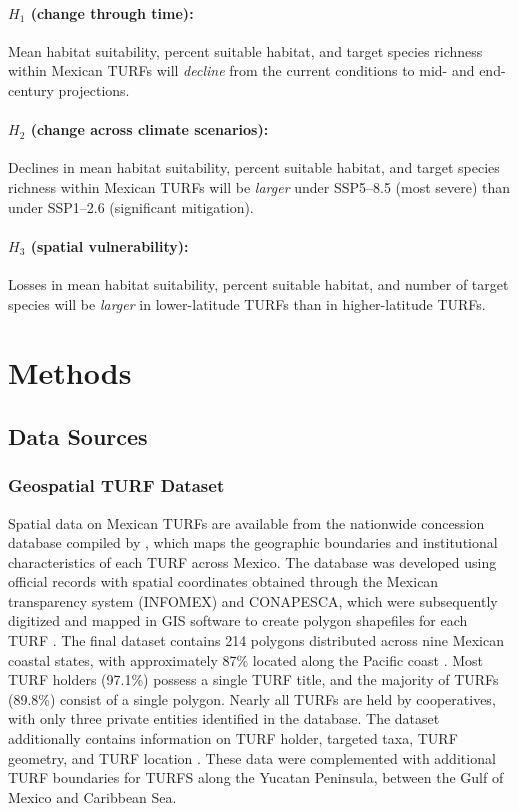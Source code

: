 \documentclass[12pt]{article}
\begin{document}
\paragraph{$H_1$ (change through time):} Mean habitat suitability, percent suitable habitat, and target species richness within Mexican TURFs will \textit{decline} from the current conditions to mid- and end-century projections.

\paragraph{$H_2$ (change across climate scenarios):} Declines in mean habitat suitability, percent suitable habitat, and target species richness within Mexican TURFs will be \textit{larger} under SSP5–8.5 (most severe) than under SSP1–2.6 (significant mitigation).

\paragraph{$H_3$ (spatial vulnerability):}
Losses in mean habitat suitability, percent suitable habitat, and number of target species will be \textit{larger} in lower-latitude TURFs than in higher-latitude TURFs.

\section{Methods}

\subsection{Data Sources}

\subsubsection{Geospatial TURF Dataset}

Spatial data on Mexican TURFs are available from the nationwide concession database compiled by \citet{AcevesBueno2023}, which maps the geographic boundaries and institutional characteristics of each TURF across Mexico. The database was developed using official records with spatial coordinates obtained through the Mexican transparency system (INFOMEX) and CONAPESCA, which were subsequently digitized and mapped in GIS software to create polygon shapefiles for each TURF \citep{AcevesBueno2023}. The final dataset contains 214 polygons distributed across nine Mexican coastal states, with approximately 87\% located along the Pacific coast \citep{AcevesBueno2023}. Most TURF holders (97.1\%) possess a single TURF title, and the majority of TURFs (89.8\%) consist of a single polygon. Nearly all TURFs are held by cooperatives, with only three private entities identified in the database. The dataset additionally contains information on TURF holder, targeted taxa, TURF geometry, and TURF location \citep{AcevesBueno2023}. These data were complemented with additional TURF boundaries for TURFS along the Yucatan Peninsula, between the Gulf of Mexico and Caribbean Sea.
\end{document}
